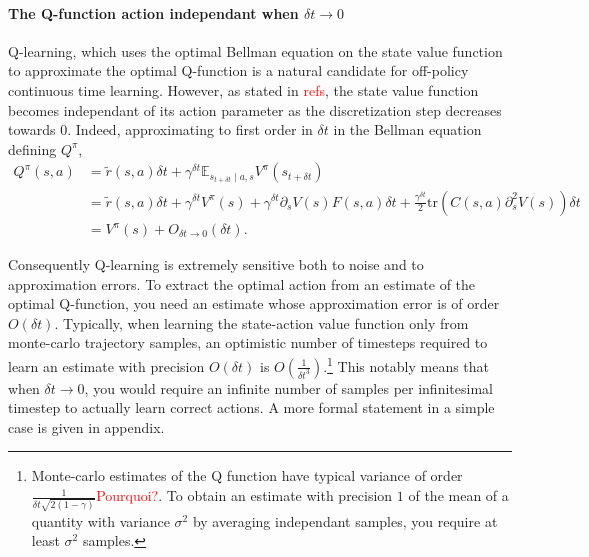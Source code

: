 \documentclass[11pt]{article}
\newcommand{\deltat}{{\delta t}}
\newcommand{\E}{\mathbb{E}}
\newcommand{\TODO}[1]{\textcolor{red}{#1}}
\newcommand{\bigO}[1]{O(#1)}
\begin{document}
\paragraph{The Q-function action independant when $\deltat \to 0$}
Q-learning, which uses the optimal Bellman equation on the state value function
to approximate the optimal Q-function is a natural candidate for off-policy
continuous time learning. However, as stated in \TODO{refs}, the state value function
becomes independant of its action parameter as the discretization step decreases towards
$0$. Indeed, approximating to first order in $\deltat$ in the Bellman equation defining
$Q^\pi$, 
\begin{align}
	Q^\pi(s, a) &= \tilde{r}(s, a)\deltat + \gamma^\deltat \E_{s_{t+\deltat} \mid a, s} 
	V^\pi(s_{t+\deltat})\nonumber\\
	&= \tilde{r}(s, a)\deltat + \gamma^\deltat V^\pi(s) + \gamma^\deltat \partial_s V(s) F(s, a) \deltat
	+ \frac{\gamma^\deltat}{2} \text{tr}\left(C(s, a)\partial^2_{s} V(s)\right) \deltat\nonumber\\
	&= V^\pi(s) + O_{\deltat \to 0}(\deltat).
\end{align}

Consequently Q-learning is extremely sensitive both to noise and to approximation errors.
To extract the optimal action from an estimate of the optimal Q-function, you need an estimate
whose approximation error is of order $\bigO{\deltat}$.
Typically, when learning the state-action value function only from monte-carlo trajectory samples, 
an optimistic number of timesteps required to learn an estimate with precision $\bigO{\deltat}$ is
$\bigO{\frac{1}{\deltat^3}}$.\footnote{
	Monte-carlo estimates of the Q function have typical variance of order
	$\frac{1}{\deltat\sqrt{2(1 - \gamma)}}$\TODO{Pourquoi?}. To obtain an estimate with precision $1$ of the mean
	of a quantity with variance $\sigma^2$ by averaging independant samples, you
	require at least $\sigma^2$ samples.}
This notably means that when $\deltat \to 0$, you would require an infinite number of samples
per infinitesimal timestep to actually learn correct actions. A more formal statement in a simple case
is given in appendix.
\end{document}
